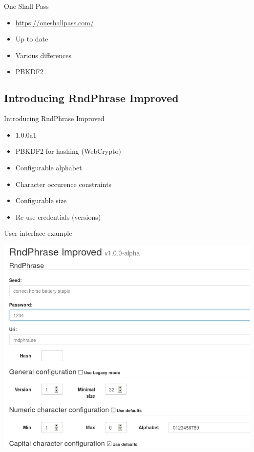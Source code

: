 \documentclass{beamer}
\begin{document}
\begin{frame}{One Shall Pass}
  \begin{itemize}
    \item \url{https://oneshallpass.com/}
    \item Up to date
    \item Various differences
    \item PBKDF2
  \end{itemize}
\end{frame}


\subsection{Introducing RndPhrase Improved}
\begin{frame}{Introducing RndPhrase Improved}
  \begin{itemize}
    \item 1.0.0a1
    \item PBKDF2 for hashing (WebCrypto)
    \item Configurable alphabet
    \item Character occurence constraints
    \item Configurable size
    \item Re-use credentials (versions)
  \end{itemize}
\end{frame}

\begin{frame}{User interface example}
  \begin{center}
    \includegraphics[scale=0.35]{rndphrase-screenshot.png}
  \end{center}
\end{frame}
\end{document}
